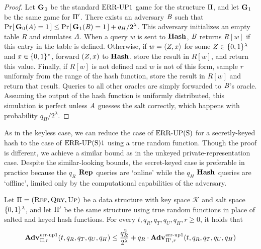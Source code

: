 \begin{proof}
Let $\mathbf{G}\hspace{0.5pt}_0$ be the standard $\textnormal{ERR\mbox{-}UP}1$ game for the structure $\mathrm{\Pi}$, and let $\mathbf{G}\hspace{0.5pt}_1$ be the same game for $\mathrm{\Pi}'$. There exists an adversary $\mathit{B}$ such that $\Pr\hspace{-1pt}\left[\,\mathbf{G}\hspace{0.5pt}_0(\mathit{A}) = 1\,\right] \le \Pr\hspace{-1pt}\left[\,\mathbf{G}\hspace{0.5pt}_1(\mathit{B}) = 1\,\right] + q_H/2^\lambda$. This adversary initializes an empty table $R$ and simulates $\mathit{A}$. When a query $w$ is sent to $\mathbf{Hash}\hspace{0.5pt}$, $\mathit{B}$ returns $R[w]$ if this entry in the table is defined. Otherwise, if $w = \langle Z, x\rangle$ for some $Z \in \{0,1\}^\lambda$ and $x \in \{0,1\}^*$, forward $(Z, x)$ to $\mathbf{Hash}\hspace{0.5pt}$, store the result in $R[w]$, and return this value. Finally, if $R[w]$ is not defined and $w$ is not of this form, sample $r$ uniformly from the range of the hash function, store the result in $R[w]$ and return that result. Queries to all other oracles are simply forwarded to $\mathit{B}$'s oracle. Assuming the output of the hash function is uniformly distributed, this simulation is perfect unless $\mathit{A}$ guesses the salt correctly, which happens with probability $q_H/2^\lambda$.\missingqed
\end{proof}


As in the keyless case, we can reduce the case of $\textnormal{ERR\mbox{-}UP(S)}$ for a secretly-keyed hash to the case of $\textnormal{ERR\mbox{-}UP(S)}1$ using a true random function. Though the proof is different, we achieve a similar bound as in the unkeyed private-representation case. Despite the similar-looking bounds, the secret-keyed case is preferable in practice because the $q_R$ $\mathbf{Rep}\hspace{0.5pt}$ queries are `online' while the $q_H$ $\mathbf{Hash}\hspace{0.5pt}$ queries are `offline', limited only by the computational capabilities of the adversary.

\begin{lemma}\label{lemma:keytorand}
  Let $\mathrm{\Pi} = (\textsc{Rep}, \textsc{Qry}, \textsc{Up})$ be a data structure with key space $\mathcal{K}$ and salt space $\{0,1\}^\lambda$, and let $\mathrm{\Pi}'$ be the same structure using true random functions in place of salted and keyed hash functions. For every $t, q_R, q_T, q_U, q_H, r \geq 0$, it holds that
  \[
    \Adv{\errep1}_{\struct,r}(t, q_R, q_T, q_U, q_H) \leq \frac{q_R^2}{2^\lambda} + q_R \cdot \Adv{\errep1}_{\struct',r}(t, q_R, q_T, q_U, q_H)
  \]
\end{lemma}

